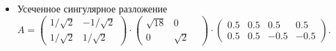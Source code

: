 \documentclass{article}
\begin{document}
\begin{itemize}
\begin{itemize}
        \item Усеченное сингулярное разложение $A=\left(\begin{array}{rr}1/\sqrt{2} & -1/\sqrt{2}\\1/\sqrt{2} & 1/\sqrt{2}\end{array}\right)\cdot\left(\begin{array}{rrrr}\sqrt{18} & 0 &\\0 & \sqrt{2}\end{array}\right)\cdot\left(\begin{array}{rrrr}0.5 & 0.5 & 0.5 & 0.5\\0.5 & 0.5 & -0.5 & -0.5\end{array}\right)$.
    \end{itemize}
\end{itemize}
\end{document}
